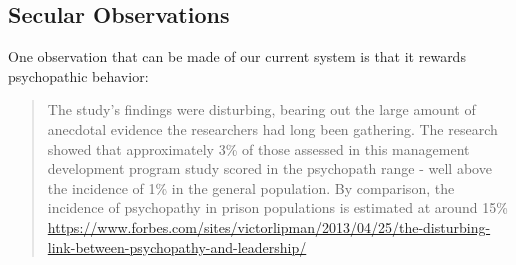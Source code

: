 \documentclass[11pt]{article}
\begin{document}
\subsection{Secular Observations}

One observation that can be made of our current system is that it rewards psychopathic behavior:
\begin{quote}
   The study's findings were disturbing, bearing out the large amount of anecdotal evidence the researchers had long been gathering. The research showed that approximately 3\% of those assessed in this management development program study scored in the
   psychopath range - well above the incidence of 1\% in the general population. By comparison, the incidence of psychopathy in prison populations is estimated at around 15\% \url{https://www.forbes.com/sites/victorlipman/2013/04/25/the-disturbing-link-between-psychopathy-and-leadership/}
\end{quote}
\end{document}
